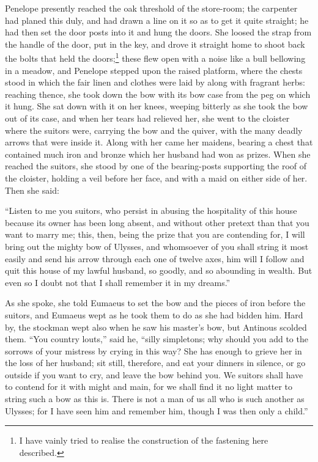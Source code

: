 Penelope presently reached the oak threshold of the store-room; the carpenter
had planed this duly, and had drawn a line on it so as to get it quite
straight; he had then set the door posts into it and hung the doors. She loosed
the strap from the handle of the door, put in the key, and drove it straight
home to shoot back the bolts that held the doors;\footnote{I have vainly tried to realise the construction of the fastening here
described.} these flew open with a noise like a
bull bellowing in a meadow, and Penelope stepped upon the raised platform,
where the chests stood in which the fair linen and clothes were laid by along
with fragrant herbs: reaching thence, she took down the bow with its bow case
from the peg on which it hung. She sat down with it on her knees, weeping
bitterly as she took the bow out of its case, and when her tears had relieved
her, she went to the cloister where the suitors were, carrying the bow and the
quiver, with the many deadly arrows that were inside it. Along with her came
her maidens, bearing a chest that contained much iron and bronze which her
husband had won as prizes. When she reached the suitors, she stood by one of
the bearing-posts supporting the roof of the cloister, holding a veil before
her face, and with a maid on either side of her. Then she said:

“Listen to me you suitors, who persist in abusing the hospitality of this house
because its owner has been long absent, and without other pretext than that you
want to marry me; this, then, being the prize that you are contending for, I
will bring out the mighty bow of Ulysses, and whomsoever of you shall string it
most easily and send his arrow through each one of twelve axes, him will I
follow and quit this house of my lawful husband, so goodly, and so abounding in
wealth. But even so I doubt not that I shall remember it in my dreams.”

As she spoke, she told Eumaeus to set the bow and the pieces of iron before the
suitors, and Eumaeus wept as he took them to do as she had bidden him. Hard by,
the stockman wept also when he saw his master’s bow, but Antinous scolded them.
“You country louts,” said he, “silly simpletons; why should you add to the
sorrows of your mistress by crying in this way? She has enough to grieve her in
the loss of her husband; sit still, therefore, and eat your dinners in silence,
or go outside if you want to cry, and leave the bow behind you. We suitors
shall have to contend for it with might and main, for we shall find it no light
matter to string such a bow as this is. There is not a man of us all who is
such another as Ulysses; for I have seen him and remember him, though I was
then only a child.”


